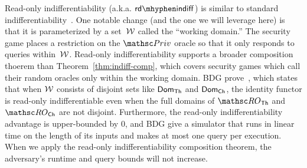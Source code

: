 Read-only indifferentiability (a.k.a. $\rdindiff$) is similar to standard indifferentiability~\cite{TCC:MauRenHol04}.
One notable change (and the one we will leverage here) is that it is parameterized by a set~${\cal W}$ called the ``working domain.''
The security game places a restriction on the $\PrivO$ oracle so that it only responds to queries within~${\cal W}$.
Read-only indifferentiability supports a broader composition thoerem than Theorem~\ref{thm:indiff-comp}, which covers security games which call their random oracles only within the working domain.
BDG prove~\cite[Theorem~1]{EC:BelDavGun20}, which states that when ${\cal W}$ consists of disjoint sets like $\mathsf{Dom}_{\mathsf{Th}}$ and $\mathsf{Dom}_{\mathsf{Ch}}$, the identity functor is read-only indifferentiable even when the full domains of $\ROthash$ and $\ROchash$ are not disjoint.
Furthermore, the read-only indifferentiability advantage is upper-bounded by $0$, and BDG give a simulator that runs in linear time on the length of its inputs and makes at most one query per execution. 
When we apply the read-only indifferentiability composition theorem, the adversary's runtime and query bounds will not increase.

